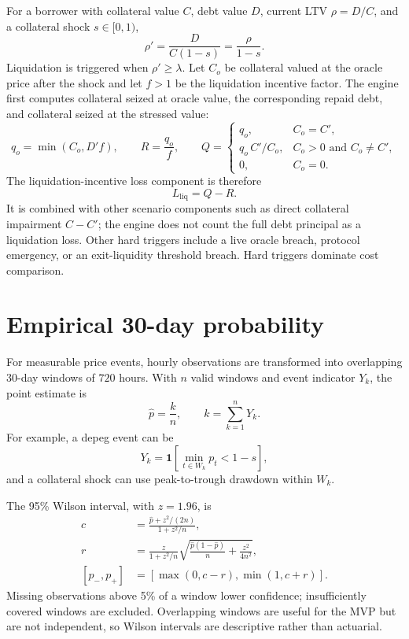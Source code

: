 \documentclass[11pt,a4paper]{article}
\newcommand{\ind}{\mathbf{1}}
\begin{document}
For a borrower with collateral value $C$, debt value $D$, current LTV
$\rho=D/C$, and a collateral shock $s\in[0,1)$,
\begin{equation}
\rho'=\frac{D}{C(1-s)}=\frac{\rho}{1-s}.
\end{equation}
Liquidation is triggered when $\rho'\geq\lambda$.  Let $C_o$ be collateral
valued at the oracle price after the shock and let $f>1$ be the liquidation
incentive factor.  The engine first computes collateral seized at oracle value,
the corresponding repaid debt, and collateral seized at the stressed value:
\begin{equation}
q_o=\min(C_o,D'f),\qquad R=\frac{q_o}{f},
\qquad
Q=\begin{cases}
q_o, & C_o=C',\\
q_o\,C'/C_o, & C_o>0\text{ and }C_o\neq C',\\
0, & C_o=0.
\end{cases}
\end{equation}
The liquidation-incentive loss component is therefore
\begin{equation}
L_{\mathrm{liq}}=Q-R.
\end{equation}
It is combined with other scenario components such as direct collateral
impairment $C-C'$; the engine does not count the full debt principal as a
liquidation loss.
Other hard triggers include a live oracle breach, protocol emergency, or an
exit-liquidity threshold breach.  Hard triggers dominate cost comparison.

\section{Empirical 30-day probability}

For measurable price events, hourly observations are transformed into
overlapping 30-day windows of $720$ hours.  With $n$ valid windows and event
indicator $Y_k$, the point estimate is
\begin{equation}
\widehat p=\frac{k}{n},\qquad k=\sum_{k=1}^{n}Y_k.
\end{equation}
For example, a depeg event can be
\begin{equation}
Y_k=\ind\left[\min_{t\in W_k}p_t < 1-s\right],
\end{equation}
and a collateral shock can use peak-to-trough drawdown within $W_k$.

The 95\% Wilson interval, with $z=1.96$, is
\begin{align}
c&=\frac{\widehat p+z^2/(2n)}{1+z^2/n},\\
r&=\frac{z}{1+z^2/n}\sqrt{\frac{\widehat p(1-\widehat p)}{n}+\frac{z^2}{4n^2}},\\
[p_-,p_+]&=[\max(0,c-r),\min(1,c+r)].
\end{align}
Missing observations above 5\% of a window lower confidence; insufficiently
covered windows are excluded.  Overlapping windows are useful for the MVP but
are not independent, so Wilson intervals are descriptive rather than actuarial.
\end{document}
